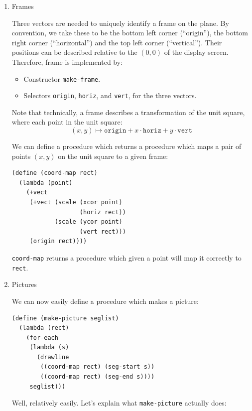 \documentclass[9pt]{report}
\begin{document}
\begin{enumerate}
\item Frames
\label{sec:orgbe39c2b}

Three vectors are needed to uniquely identify a frame on the
plane. By convention, we take these to be the bottom left corner
(``origin''), the bottom right corner (``horizontal'') and the top
left corner (``vertical''). Their positions can be described
relative to the \((0,0)\) of the display screen. Therefore,
frame is implemented by:
\begin{itemize}
\item Constructor \texttt{make-frame}.
\item Selectors \texttt{origin}, \texttt{horiz}, and \texttt{vert}, for the three vectors.
\end{itemize}

Note that technically, a frame describes a transformation of
the unit square, where each point in the unit square:
$$(x,y)\mapsto \mathtt{origin} + x\cdot \mathtt{horiz} + y\cdot
     \mathtt{vert}$$

We can define a procedure which returns a procedure which maps
a pair of points \((x,y)\) on the unit square to a given frame:

\begin{verbatim}
(define (coord-map rect)
  (lambda (point)
    (+vect
     (+vect (scale (xcor point)
                   (horiz rect))
            (scale (ycor point)
                   (vert rect)))
     (origin rect))))
\end{verbatim}

\texttt{coord-map} returns a procedure which given a point will map it
correctly to \texttt{rect}.

\item Pictures
\label{sec:orgc5855e1}

We can now easily define a procedure which makes a picture:
\begin{verbatim}
(define (make-picture seglist)
  (lambda (rect)
    (for-each
     (lambda (s)
       (drawline
        ((coord-map rect) (seg-start s))
        ((coord-map rect) (seg-end s))))
     seglist)))
\end{verbatim}

Well, relatively easily. Let's explain what \texttt{make-picture}
actually does:


\end{enumerate}
\end{document}
